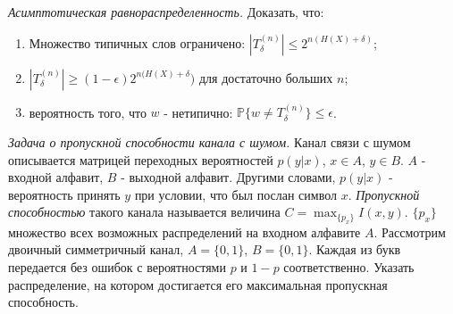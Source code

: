 \begin{problem} \textit{Асимптотическая равнораспределенность.}
Доказать, что:
\begin{enumerate}
\item Множество типичных слов ограничено: $|T_{\delta}^{(n)}| \leq 2^{n(H(X) + \delta)}$;
\item $|T_{\delta}^{(n)}| \geq (1-\epsilon)2^{n(H(X) + \delta})$ для достаточно больших $n$;
\item вероятность того, что $w$ - нетипично: $\mathbb{P}\{w \neq T_{\delta}^{(n)} \} \leq \epsilon$.
\end{enumerate}
\end{problem}
\begin{comment}
\begin{remark} Идея о типичных последовательностях лежит в основе кодирования. Например, $\delta$-типичные $n$-буквенные слова кодируются при помощи двоичных последовательностей длины $n(H(X) + \delta)$, нетипичные отбрасываются или представляются одним и тем же добавочным символом. Очевидно, что при декодировании (восстановлении) вероятность ошибки не превысит $\epsilon$.
\end{remark}

\begin{problem} Рассмотрите связь между доказательством принципа асимптотической равнораспределенности и эквивалентностью (для больших систем)энтропий Больцмана и Гиббса.
\end{problem}
\end{comment}
\begin{problem} \textit{Задача о пропускной способности канала с шумом.} Канал связи с шумом описывается матрицей переходных вероятностей $p(y|x)$, $x \in A$, $y \in B$. $A$ - входной алфавит, $B$ - выходной алфавит. Другими словами, $p(y|x)$ - вероятность принять $y$ при условии, что был послан символ $x$. \textit{Пропускной способностью} такого канала называется величина $C = \max_{\{p_x\}} I(x, y)$. $\{p_x\}$ множество всех возможных распределений на входном алфавите $A$.
Рассмотрим двоичный симметричный канал, $A =\{0, 1\}$, $B =\{0, 1\}$. Каждая из букв передается без ошибок с вероятностями $p$ и $1-p$ соответственно. Указать распределение, на котором достигается его максимальная пропускная способность.
\end{problem}
